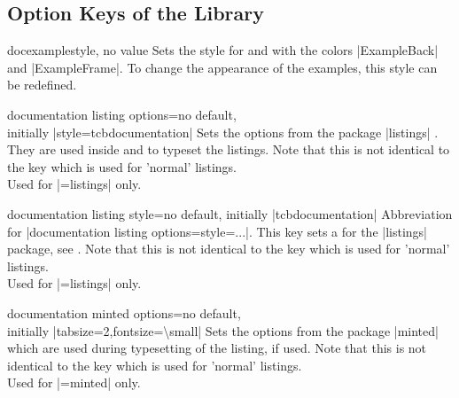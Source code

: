 \clearpage
\subsection{Option Keys of the Library}

\begin{docTcbKey}[][doc updated=2015-03-16]{docexample}{}{style, no value}
  Sets the style for  and 
  with the colors |ExampleBack| and |ExampleFrame|.
  To change the appearance of the examples, this style can be
  redefined.
\begin{dispListing}
\end{dispListing}
\end{docTcbKey}

\begin{docTcbKey}{documentation listing options}{=}{no default,\\\hspace*{\fill} initially |style=tcbdocumentation|}
  Sets the options from the package |listings| \cite{heinz:2015a}.
  They are used inside  and  to typeset
  the listings. Note that this is not identical to the key
   which is used for 'normal' listings.\\
  Used for |=listings| only.
\end{docTcbKey}

\begin{docTcbKey}{documentation listing style}{=}{no default, initially |tcbdocumentation|}
  Abbreviation for |documentation listing options={style=...}|.
  This key sets a 
  for the |listings| package, see \cite{heinz:2015a}.
  Note that this is not identical to the key
   which is used for 'normal' listings.\\
  Used for |=listings| only.
\end{docTcbKey}

\begin{docTcbKey}{documentation minted options}{=}{no default,\\\hspace*{\fill} initially |tabsize=2,fontsize=\textbackslash small|}
  Sets the options from the package |minted| \cite{poore:2015a}
  which are used during typesetting of the listing, if used.
  Note that this is not identical to the key
   which is used for 'normal' listings.\\
  Used for |=minted| only.
\end{docTcbKey}

